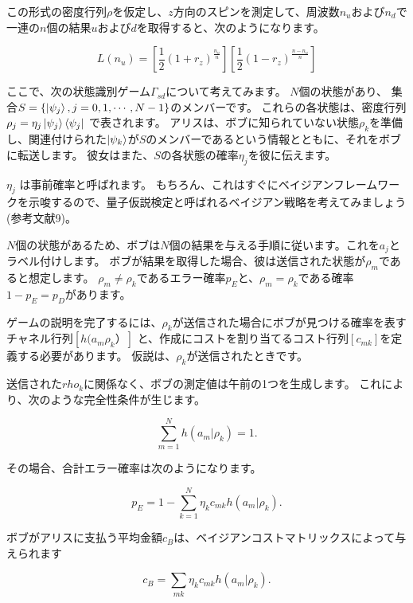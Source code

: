 この形式の密度行列$\rho$を仮定し、$z$方向のスピンを測定して、周波数$n_u$および$n_d$で一連の$n$個の結果$u$および$d$を取得すると、次のようになります。


\begin{equation}
\label{254}
L(n_u)
= 
[ \frac{1}{2} (1 + r_z)^{\frac{n_u}{n}}]
[ \frac{1}{2} (1 - r_z)^{\frac{n - n_u}{n}} ]
\end{equation}

ここで、次の状態識別ゲーム$\Gamma_{sd}$について考えてみます。 $N$個の状態があり、
集合$S = \{ \ket{\psi_j}, j=0,1, \cdots , N-1 \}$のメンバーです。
これらの各状態は、密度行列$ \rho_j = \eta_j \ket{\psi_j} \bra{\psi_j}$ で表されます。
アリスは、ボブに知られていない状態$\rho_k$を準備し、関連付けられた$\ket{\psi_k}$が$S$のメンバーであるという情報とともに、それをボブに転送します。
彼女はまた、$S$の各状態の確率$\eta_j$を彼に伝えます。

$\eta_j$ は事前確率と呼ばれます。 もちろん、これはすぐにベイジアンフレームワークを示唆するので、量子仮説検定と呼ばれるベイジアン戦略を考えてみましょう(参考文献9)。

$N$個の状態があるため、ボブは$N$個の結果を与える手順に従います。これを$a_j$とラベル付けします。
ボブが結果を取得した場合、彼は送信された状態が$\rho_m$であると想定します。
$\rho_m \ne \rho_k$であるエラー確率$p_E$と、$\rho_m = \rho_k $である確率$1- p_E = p_D$があります。

ゲームの説明を完了するには、$\rho_k$が送信された場合にボブが見つける確率を表すチャネル行列$[h(a_m  \rho_k）]$ と、作成にコストを割り当てるコスト行列$[c_{mk}]$を定義する必要があります。 仮説は、$\rho_k$が送信されたときです。

送信された$rho_k$に関係なく、ボブの測定値は午前の1つを生成します。 これにより、次のような完全性条件が生じます。

\begin{equation}
\label{255}
\sum_{m=1}^{N} h(a_m|\rho_k) = 1.
\end{equation}

その場合、合計エラー確率は次のようになります。

\begin{equation}
\label{256}
p_E
=
1-\sum_{k=1}^{N} \eta_k c_{mk} h(a_m|\rho_k) .
\end{equation}

ボブがアリスに支払う平均金額$c_B$は、ベイジアンコストマトリックスによって与えられます

\begin{equation}
\label{257}
c_B
=
\sum_{mk} \eta_k c_{mk} h(a_m|\rho_k) .
\end{equation}

